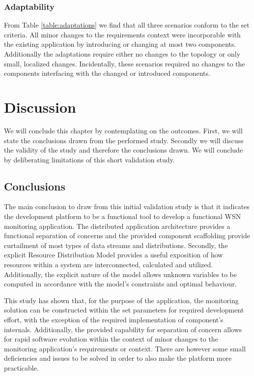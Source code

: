 \subsubsection{Adaptability}
From Table \ref{table:adaptations} we find that all three scenarios conform to the set criteria. All minor changes to the requirements context were incorporable with the existing application by introducing or changing at most two components. Additionally the adaptations require either no changes to the topology or only small, localized changes. Incidentally, these scenarios required no changes to the components interfacing with the changed or introduced components.

\section{Discussion}
We will conclude this chapter by contemplating on the outcomes. First, we will state the conclusions drawn from the performed study. Secondly we will discuss the validity of the study and therefore the conclusions drawn. We will conclude by deliberating limitations of this short validation study.
\subsection{Conclusions}
The main conclusion to draw from this initial validation study is that it indicates the development platform to be a functional tool to develop a functional WSN monitoring application. The distributed application architecture provides a functional separation of concerns and the provided component scaffolding provide curtailment of most types of data streams and distributions. Secondly, the explicit Resource Distribution Model provides a useful exposition of how resources within a system are interconnected, calculated and utilized. Additionally, the explicit nature of the model allows unknown variables to be computed in accordance with the model's constraints and optimal behaviour.

This study has shown that, for the purpose of the \idsystems \sensit application, the monitoring solution can be constructed within the set parameters for required development effort, with the exception of the required implementation of component's internals. Additionally, the provided capability for separation of concern allows for rapid software evolution within the context of minor changes to the monitoring application's requirements or context. There are however some small deficiencies and issues to be solved in order to also make the platform more practicable. 

